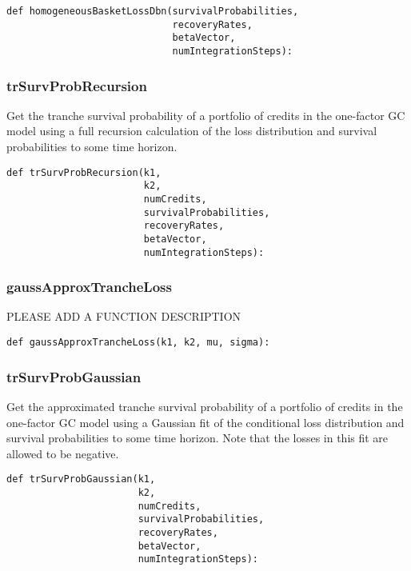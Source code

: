 \documentclass[twoside,11pt]{book}
\begin{document}
\begin{lstlisting}
def homogeneousBasketLossDbn(survivalProbabilities,
                             recoveryRates,
                             betaVector,
                             numIntegrationSteps):
\end{lstlisting}

\subsubsection*{{\bf trSurvProbRecursion}}
Get the tranche survival probability of a portfolio of credits in the one-factor GC model using a full recursion calculation of the loss distribution and survival probabilities to some time horizon.  

\begin{lstlisting}
def trSurvProbRecursion(k1,
                        k2,
                        numCredits,
                        survivalProbabilities,
                        recoveryRates,
                        betaVector,
                        numIntegrationSteps):
\end{lstlisting}

\subsubsection*{{\bf gaussApproxTrancheLoss}}
PLEASE ADD A FUNCTION DESCRIPTION

\begin{lstlisting}
def gaussApproxTrancheLoss(k1, k2, mu, sigma):
\end{lstlisting}

\subsubsection*{{\bf trSurvProbGaussian}}
Get the approximated tranche survival probability of a portfolio of credits in the one-factor GC model using a Gaussian fit of the conditional loss distribution and survival probabilities to some time horizon. Note that the losses in this fit are allowed to be negative.  

\begin{lstlisting}
def trSurvProbGaussian(k1,
                       k2,
                       numCredits,
                       survivalProbabilities,
                       recoveryRates,
                       betaVector,
                       numIntegrationSteps):
\end{lstlisting}
\end{document}

